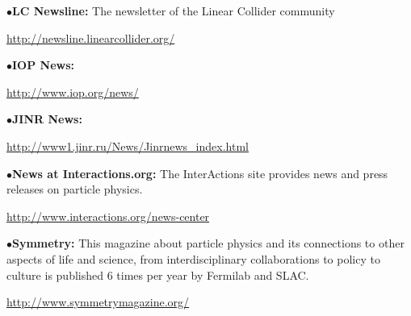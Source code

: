\item{$\bullet$}{\bf LC Newsline:}
The newsletter of the Linear Collider community
	\item{}\qquad\url{http://newsline.linearcollider.org/}
	\item{}
\medskip

\item{$\bullet$}{\bf IOP News:}
     \item{}\qquad\url{http://www.iop.org/news/}

\medskip

\item{$\bullet$}{\bf JINR News:}
 \item{}\qquad\url{http://www1.jinr.ru/News/Jinrnews_index.html}

\medskip

\item{$\bullet$}{\bf News at Interactions.org:}
The InterActions site provides news and press releases on particle physics.
     \item{}\qquad\url{http://www.interactions.org/news-center}
     \item{}

\medskip





\medskip

\item{$\bullet$}{\bf Symmetry:}
This magazine about particle physics and its connections to other aspects of life and science, from interdisciplinary collaborations to policy to culture is published 6 times per year by Fermilab and SLAC.
     \item{}\qquad\url{http://www.symmetrymagazine.org/}
     \item{}

\medskip
\medskip



